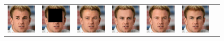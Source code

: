\begin{figure}
\begin{center}
\begin{tabular}{ccccccc}
        \includegraphics[width=.145\textwidth]{Chapter2/samples/extended_results/inpainting/21/x.png} &   
        \includegraphics[width=.145\textwidth]{Chapter2/samples/extended_results/inpainting/21/y.png} &
        \includegraphics[width=.145\textwidth]{Chapter2/samples/extended_results/inpainting/21/CDE.png} & 
        \includegraphics[width=.145\textwidth]{Chapter2/samples/extended_results/inpainting/21/CDiffE.png} &
        \includegraphics[width=.145\textwidth]{Chapter2/samples/extended_results/inpainting/21/cmde.png} &
        \includegraphics[width=.145\textwidth]{Chapter2/samples/extended_results/inpainting/21/VS-CMDE.png}\\
        

\end{tabular}
\end{center}
\end{figure}
